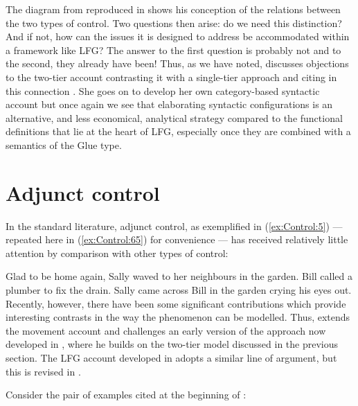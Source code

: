 \documentclass[output=paper,hidelinks]{langscibook}
\begin{document}
The diagram from \citet[85]{Landau2015} reproduced in  shows his conception of the relations between the two types of control.  Two questions then arise: do we need this distinction? And if not, how can the issues it is designed to address be accommodated within a framework like LFG? The answer to the first question is probably not and to the second, they already have been!
Thus, as we have noted, \citet{Reed2020} discusses objections to the two-tier account contrasting it with a single-tier approach and citing in this connection \citet{Haug2014b}. She goes on to develop her own category-based syntactic account but once again we see that elaborating syntactic configurations is an alternative, and less economical, analytical strategy compared to the functional definitions that lie at the heart of LFG, especially once they are combined with a semantics of the Glue type.

\section{Adjunct control}
\label{sec:Control:12}

In the standard literature, adjunct control, as exemplified in (\ref{ex:Control:5}) --- repeated here in (\ref{ex:Control:65}) for convenience --- has received relatively little attention by comparison with other types of control:

\ea\label{ex:Control:65}
\ea\label{ex:Control:65a} Glad to be home again, Sally waved to her neighbours in the garden.
\ex\label{ex:Control:65b} Bill called a plumber to fix the drain.
\ex\label{ex:Control:65c} Sally came across Bill in the garden crying his eyes out.
\z\z
Recently, however, there have been some significant contributions which provide interesting contrasts in the way the phenomenon can be modelled. Thus, \citet{Green2019} extends the movement account and challenges an early version of the approach now developed in \citet{Landau2021}, where he builds on the two-tier model discussed in the previous section. The LFG account developed in \citet{Donaldson2021} adopts a similar line of argument, but this is revised in \citet{Donaldson2021b}.

Consider the pair of examples cited at the beginning of \citet{Donaldson2021b}:
\end{document}
